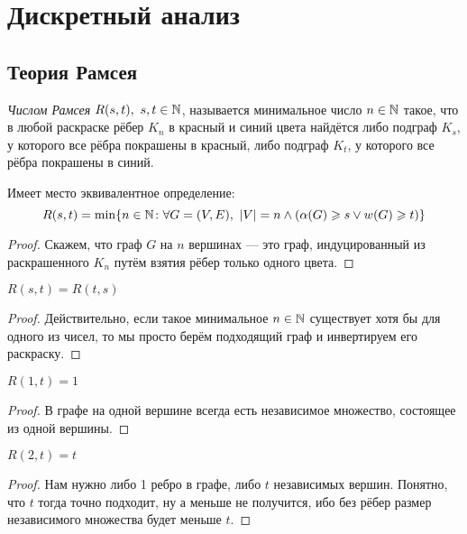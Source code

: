 \section{Дискретный анализ}

\subsection{Теория Рамсея}

\begin{definition}
	\textit{Числом Рамсея} $R(s, t),\ s, t \in \mathbb{N}$, называется минимальное число $n \in \mathbb{N}$ такое, что в любой раскраске рёбер $K_n$ в красный и синий цвета найдётся либо подграф $K_s$, у которого все рёбра покрашены в красный, либо подграф $K_t$, у которого все рёбра покрашены в синий.
\end{definition}

\begin{proposition}
	Имеет место эквивалентное определение:
	\[
		R(s, t) = \min\{n \in \mathbb{N} \colon \forall G = (V, E),\ |V| = n \wedge (\alpha(G) \geqslant s \vee w(G) \geqslant t)\}
	\]
\end{proposition}

\begin{proof}
	Скажем, что граф $G$ на $n$ вершинах --- это граф, индуцированный из раскрашенного $K_n$ путём взятия рёбер только одного цвета.
\end{proof}

\begin{proposition}
	$R(s, t) = R(t, s)$
\end{proposition}

\begin{proof}
	Действительно, если такое минимальное $n \in \mathbb{N}$ существует хотя бы для одного из чисел, то мы просто берём подходящий граф и инвертируем его раскраску.
\end{proof}

\begin{proposition}
	$R(1, t) = 1$
\end{proposition}

\begin{proof}
	В графе на одной вершине всегда есть независимое множество, состоящее из одной вершины.
\end{proof}

\begin{proposition}
	$R(2, t) = t$
\end{proposition}

\begin{proof}
	Нам нужно либо 1 ребро в графе, либо $t$ независимых вершин. Понятно, что $t$ тогда точно подходит, ну а меньше не получится, ибо без рёбер размер независимого множества будет меньше $t$.
\end{proof}

